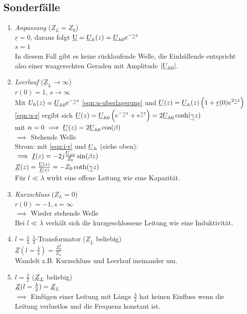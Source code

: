 \subsection{Sonderfälle}
\begin{enumerate}
    \item \emph{Anpassung} ($Z_L = Z_0$)\\
        $\underline{r} = 0$, daraus folgt $\underbar{U}=\underline{U}_h(z)=\underline{U}_{h0} e^{-\underline{\gamma} z}$\\
        $s=1$\\
        In diesem Fall gibt es keine rücklaufende Welle, die Einhüllende entspricht also einer waagerechten Geraden mit Amplitude $|\underline{U}_{h0}|$.
    \item \emph{Leerlauf} ($\underline{Z}_L \to \infty$)\\
        $r(0) = 1$, $s \to \infty$\\
        Mit $U_h(z) = \underline{U}_{h0} e^{-\underline{\gamma} z}$ \eqref{eqn:u-uberlagerung}
        und $\underline{U}(z)=\underline{U}_h(z)\left(1+\underline{r}(0) e^{2\underline{\gamma} z}\right)$
        \eqref{eqn:u-r} ergibt sich
        $\underline{U}(z) = \underline{U}_{h0}\left( e^{-\underline{\gamma} z} + e^{\underline{\gamma} z} \right) =2 \underline{U}_{h0} \cosh(\underline{\gamma} z)$\\
        mit $\alpha=0 \implies \underline{U}(z)=2 \underline{U}_{h0} \cos(\beta )$\\
        $\implies$ Stehende Welle\\
        Strom: mit \eqref{eqn:i-r} und $\underline{U}_h$ (siehe oben):\\
        $\implies \underline{I}(z)=-2j\frac{\underline{U}_{h0}}{Z_0}\sin(\beta z)$\\
        $\underline{Z}(z) = \frac{\underline{U}(z)}{\underline{I}(z)} = -Z_0\coth(\underline{\gamma} z)$\\
        Für $l \ll \lambda$ wirkt eine offene Leitung wie eine Kapazität.
        
    \item \emph{Kurzschluss} ($Z_L=0$)\\
        $r(0) = -1, s=\infty$\\
        $\implies$ Wieder stehende Welle\\
        Bei $l \ll \lambda$ verhält sich die kurzgeschlossene Leitung wie eine Induktivität.
        
    \item \emph{$l = \frac{\lambda}{4}$} $\frac{\lambda}{4}$-Transformator ($\underline{Z}_L$ beliebig)\\
        $\underline{Z}(l=\frac{\lambda}{4})=\frac{Z_0^2}{Z_L}$\\
        Wandelt z.B. Kurzschluss und Leerlauf ineinander um.

    \item \emph{$l = \frac{\lambda}{2}$} ($\underline{Z}_L$ beliebig)\\
        $\underline{Z}(l=\frac{\lambda}{2}) = \underline{Z}_L$\\
        $\implies$ Einfügen einer Leitung mit Länge $\frac{\lambda}{2}$ hat keinen Einfluss wenn die Leitung verlustlos und die Frequenz konstant ist.
\end{enumerate}
